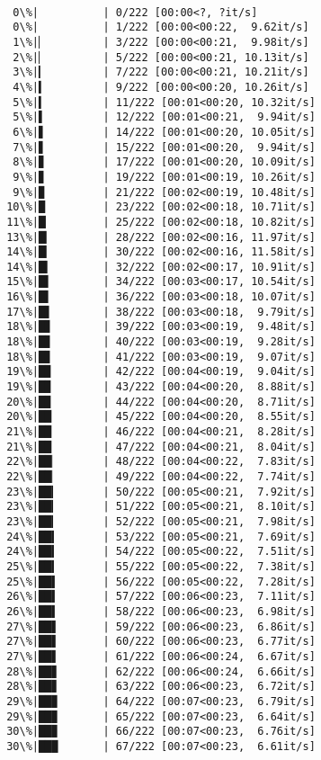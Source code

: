 \documentclass[11pt]{article}
\begin{document}
    \begin{Verbatim}[commandchars=\\\{\}]

  0\%|          | 0/222 [00:00<?, ?it/s]
  0\%|          | 1/222 [00:00<00:22,  9.62it/s]
  1\%|▏         | 3/222 [00:00<00:21,  9.98it/s]
  2\%|▏         | 5/222 [00:00<00:21, 10.13it/s]
  3\%|▎         | 7/222 [00:00<00:21, 10.21it/s]
  4\%|▍         | 9/222 [00:00<00:20, 10.26it/s]
  5\%|▍         | 11/222 [00:01<00:20, 10.32it/s]
  5\%|▌         | 12/222 [00:01<00:21,  9.94it/s]
  6\%|▋         | 14/222 [00:01<00:20, 10.05it/s]
  7\%|▋         | 15/222 [00:01<00:20,  9.94it/s]
  8\%|▊         | 17/222 [00:01<00:20, 10.09it/s]
  9\%|▊         | 19/222 [00:01<00:19, 10.26it/s]
  9\%|▉         | 21/222 [00:02<00:19, 10.48it/s]
 10\%|█         | 23/222 [00:02<00:18, 10.71it/s]
 11\%|█▏        | 25/222 [00:02<00:18, 10.82it/s]
 13\%|█▎        | 28/222 [00:02<00:16, 11.97it/s]
 14\%|█▎        | 30/222 [00:02<00:16, 11.58it/s]
 14\%|█▍        | 32/222 [00:02<00:17, 10.91it/s]
 15\%|█▌        | 34/222 [00:03<00:17, 10.54it/s]
 16\%|█▌        | 36/222 [00:03<00:18, 10.07it/s]
 17\%|█▋        | 38/222 [00:03<00:18,  9.79it/s]
 18\%|█▊        | 39/222 [00:03<00:19,  9.48it/s]
 18\%|█▊        | 40/222 [00:03<00:19,  9.28it/s]
 18\%|█▊        | 41/222 [00:03<00:19,  9.07it/s]
 19\%|█▉        | 42/222 [00:04<00:19,  9.04it/s]
 19\%|█▉        | 43/222 [00:04<00:20,  8.88it/s]
 20\%|█▉        | 44/222 [00:04<00:20,  8.71it/s]
 20\%|██        | 45/222 [00:04<00:20,  8.55it/s]
 21\%|██        | 46/222 [00:04<00:21,  8.28it/s]
 21\%|██        | 47/222 [00:04<00:21,  8.04it/s]
 22\%|██▏       | 48/222 [00:04<00:22,  7.83it/s]
 22\%|██▏       | 49/222 [00:04<00:22,  7.74it/s]
 23\%|██▎       | 50/222 [00:05<00:21,  7.92it/s]
 23\%|██▎       | 51/222 [00:05<00:21,  8.10it/s]
 23\%|██▎       | 52/222 [00:05<00:21,  7.98it/s]
 24\%|██▍       | 53/222 [00:05<00:21,  7.69it/s]
 24\%|██▍       | 54/222 [00:05<00:22,  7.51it/s]
 25\%|██▍       | 55/222 [00:05<00:22,  7.38it/s]
 25\%|██▌       | 56/222 [00:05<00:22,  7.28it/s]
 26\%|██▌       | 57/222 [00:06<00:23,  7.11it/s]
 26\%|██▌       | 58/222 [00:06<00:23,  6.98it/s]
 27\%|██▋       | 59/222 [00:06<00:23,  6.86it/s]
 27\%|██▋       | 60/222 [00:06<00:23,  6.77it/s]
 27\%|██▋       | 61/222 [00:06<00:24,  6.67it/s]
 28\%|██▊       | 62/222 [00:06<00:24,  6.66it/s]
 28\%|██▊       | 63/222 [00:06<00:23,  6.72it/s]
 29\%|██▉       | 64/222 [00:07<00:23,  6.79it/s]
 29\%|██▉       | 65/222 [00:07<00:23,  6.64it/s]
 30\%|██▉       | 66/222 [00:07<00:23,  6.76it/s]
 30\%|███       | 67/222 [00:07<00:23,  6.61it/s]

\end{Verbatim}
\end{document}
